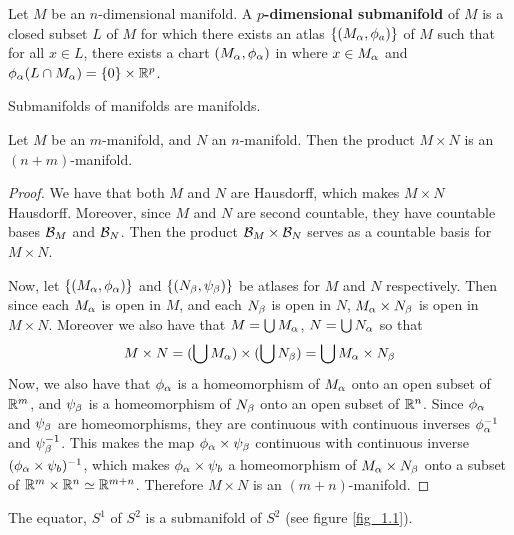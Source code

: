 \begin{definition}
    Let $M$ be an  $n$-dimensional manifold. A  \textbf{$p$-dimensional
    submanifold} of $M$ is a closed subset  $L$ of  $M$ for which there exists
    an atlas  $\{(M_\alpha,\phi_a)\}$ of $M$ such that for all  $x \in L$, there
    exists a chart  $(M_\alpha,\phi_\alpha)$ in where $x \in M_\alpha$ and  $\phi_\alpha(L \cap
    M_\alpha)=\{0\} \times \mathbb{R}^p$.
\end{definition}

\begin{lemma}\label{1.1.1}
    Submanifolds of manifolds are manifolds.
\end{lemma}

\begin{lemma}\label{1.1.2}
    Let $M$ be an  $m$-manifold, and  $N$ an  $n$-manifold. Then the product $M
    \times N$ is an $(n+m)$-manifold.
\end{lemma}
\begin{proof}
    We have that both $M$ and  $N$ are Hausdorff, which makes  $M \times N$
    Hausdorff. Moreover, since  $M$ and  $N$ are second countable, they have
    countable bases  $\mathcal{B}_M$ and  $\mathcal{B}_N$. Then the product  $\mathcal{B}_M \times
    \mathcal{B}_N$ serves as a countable basis for  $M \times N$.

    Now, let  $\{(M_\alpha, \phi_\alpha)\}$ and $\{(N_\beta, \psi_\beta)\}$ be atlases for $M$
    and  $N$ respectively. Then since each $M_\alpha$ is open in  $M$, and each
    $N_\beta$ is open in  $N$,  $M_\alpha \times N_\beta$ is open in  $M \times N$.
    Moreover we also have that  $M=\bigcup{M_\alpha}$, $N=\bigcup{N_\alpha}$ so that
    \begin{equation*}
        M \times N=(\bigcup{M_\alpha}) \times (\bigcup{N_\beta})=\bigcup{M_\alpha\times
        N_\beta}
    \end{equation*}
    Now, we also have that $\phi_\alpha$ is a homeomorphism of  $M_\alpha$ onto an open
    subset of $\mathbb{R}^m$, and  $\psi_\beta$ is a homeomorphism of  $N_\beta$ onto an open
    subset of  $\mathbb{R}^n$. Since  $\phi_\alpha$ and  $\psi_\beta$ are homeomorphisms, they
    are continuous with continuous inverses  $\phi_\alpha^{-1}$ and
    $\psi_\beta^{-1}$. This makes the map $\phi_\alpha \times \psi_\beta$ continuous with
    continuous inverse $(\phi_\alpha \times \psi_b)^{-1}$, which makes $\phi_\alpha
    \times \psi_b$ a homeomorphism of $M_\alpha \times N_\beta$ onto a subset of $\mathbb{R}^m
    \times \mathbb{R}^n \simeq \mathbb{R}^{m+n}$. Therefore $M \times N$ is an
    $(m+n)$-manifold.
\end{proof}

\begin{example}\label{example_1.2}
    The equator, $S^1$ of  $S^2$ is a submanifold of  $S^2$  (see figure
    \ref{fig_1.1}).
\end{example}

